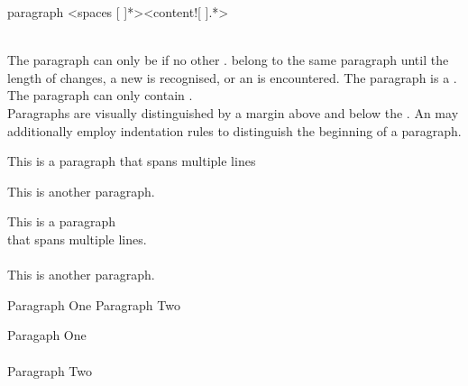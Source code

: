 \begin{identifier}{paragraph}
<spaces [ ]*><content![ ].*>
\end{identifier}
 \\

The paragraph can only be  if no other  .  belong to the same paragraph until the length of  changes, a new  is recognised, or an  is encountered. The paragraph is a . The paragraph  can only contain . \\

Paragraphs are visually distinguished by a margin above and below the . An  may additionally employ indentation rules to distinguish the beginning of a paragraph. \\

\begin{examples}
  \begin{examplesource}
This is a paragraph
that spans multiple lines

This is another paragraph.
  \end{examplesource}
  \begin{exampleoutput}
    This is a paragraph\\
    that spans multiple lines.\\
    \\
    This is another paragraph.
  \end{exampleoutput}
  \begin{examplesource}
Paragraph One
  Paragraph Two
  \end{examplesource}
  \begin{exampleoutput}
    Paragaph One\\
    \\
    Paragraph Two
  \end{exampleoutput}
\end{examples}

